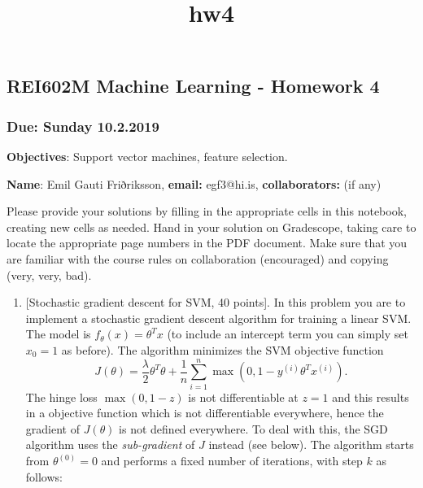 \documentclass[11pt]{article}
\title{hw4}
\providecommand{\tightlist}{%
      \setlength{\itemsep}{0pt}\setlength{\parskip}{0pt}}
\begin{document}
    
    
    \maketitle
    
    

    
    \subsection{REI602M Machine Learning - Homework
4}\label{rei602m-machine-learning---homework-4}

\subsubsection{Due: Sunday 10.2.2019}\label{due-sunday-10.2.2019}

\textbf{Objectives}: Support vector machines, feature selection.

\textbf{Name}: Emil Gauti Friðriksson, \textbf{email: } egf3@hi.is,
\textbf{collaborators:} (if any)

Please provide your solutions by filling in the appropriate cells in
this notebook, creating new cells as needed. Hand in your solution on
Gradescope, taking care to locate the appropriate page numbers in the
PDF document. Make sure that you are familiar with the course rules on
collaboration (encouraged) and copying (very, very, bad).

    \begin{enumerate}
\def\labelenumi{\arabic{enumi})}
\tightlist
\item
  {[}Stochastic gradient descent for SVM, 40 points{]}. In this problem
  you are to implement a stochastic gradient descent algorithm for
  training a linear SVM. The model is \(f_\theta(x)=\theta^T x\) (to
  include an intercept term you can simply set \(x_0=1\) as before). The
  algorithm minimizes the SVM objective function \[
     J(\theta) = \frac{\lambda}{2}\theta^T \theta + \frac{1}{n} \sum_{i=1}^n \max(0, 1-y^{(i)}\theta^T x^{(i)}).
  \] The hinge loss \(\max(0, 1-z)\) is not differentiable at \(z=1\)
  and this results in a objective function which is not differentiable
  everywhere, hence the gradient of \(J(\theta)\) is not defined
  everywhere. To deal with this, the SGD algorithm uses the
  \emph{sub-gradient} of \(J\) instead (see below). The algorithm starts
  from \(\theta^{(0)}=0\) and performs a fixed number of iterations,
  with step \(k\) as follows:
\end{enumerate}
\end{document}
